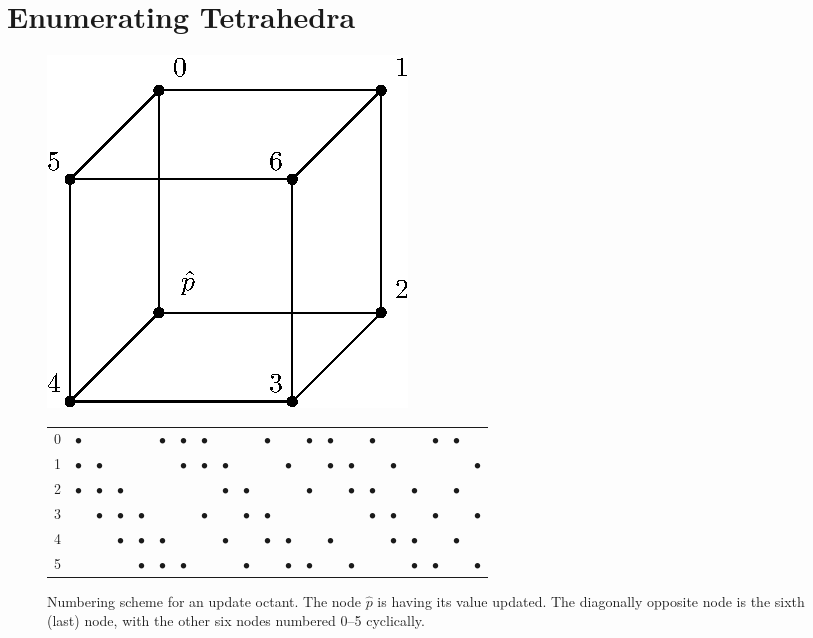 \documentclass[eikonal.tex]{subfiles}
\begin{document}
\section{Enumerating Tetrahedra}

\begin{figure}[h]
  \centering
  \includegraphics{octant-numbering.eps}
  \caption{Numbering scheme for an update octant. The node $\hat{p}$
    is having its value updated. The diagonally opposite node is the
    sixth (last) node, with the other six nodes numbered 0--5
    cyclically.}\label{fig:octant-numbering}
  \vspace{1em}
  \begin{tabular}{c|cccccc|cccccc|cccccc|cc}
    0 & $\bullet$ & & & & $\bullet$ & $\bullet$ & $\bullet$ & & & $\bullet$ & & $\bullet$ & $\bullet$ & & $\bullet$ & & & $\bullet$ & $\bullet$ & \\
    1 & $\bullet$ & $\bullet$ & & & & $\bullet$ & $\bullet$ & $\bullet$ & & & $\bullet$ & & $\bullet$ & $\bullet$ & & $\bullet$ & & & & $\bullet$ \\
    2 & $\bullet$ & $\bullet$ & $\bullet$ & & & & & $\bullet$ & $\bullet$ & & & $\bullet$ & & $\bullet$ & $\bullet$ & & $\bullet$ & & $\bullet$ & \\
    3 & & $\bullet$ & $\bullet$ & $\bullet$ & & & $\bullet$ & & $\bullet$ & $\bullet$ & & & & & $\bullet$ & $\bullet$ & & $\bullet$ & & $\bullet$ \\
    4 & & & $\bullet$ & $\bullet$ & $\bullet$ & & & $\bullet$ & & $\bullet$ & $\bullet$ & & $\bullet$ & & & $\bullet$ & $\bullet$ & & $\bullet$ & \\
    5 & & & & $\bullet$ & $\bullet$ & $\bullet$ & & & $\bullet$ & & $\bullet$ & $\bullet$ & & $\bullet$ & & & $\bullet$ & $\bullet$ & & $\bullet$ \\

\end{tabular}
\end{figure}
\end{document}
